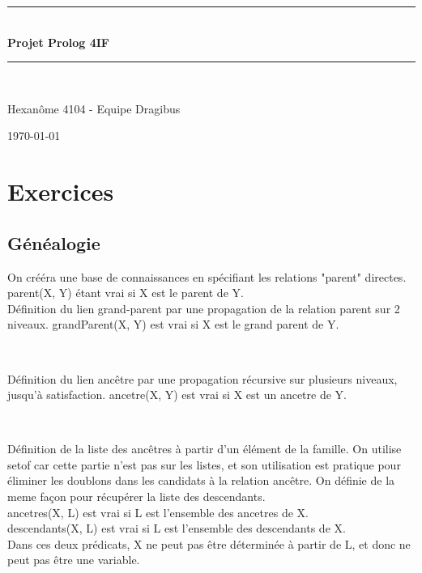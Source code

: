 \documentclass[a4paper, 11pt]{article}
\newcommand{\HRule}{\rule{\linewidth}{0.5mm}}
\newenvironment{DDbox}[1]{
\begin{lrbox}{\BBbox}\begin{minipage}{\linewidth}}
{\end{minipage}\end{lrbox}\noindent\colorbox{Zgris}{\usebox{\BBbox}} \\
[.5cm]}
\begin{document}
\begin{titlepage}
    \begin{center}
        \HRule \\[0.4cm]
        {\huge \bfseries Projet Prolog 4IF}
        \HRule \\[1.5cm]

        \begin{minipage}{0.8\textwidth}
            \center
            \large
            Hexanôme 4104 - Equipe Dragibus
        \end{minipage}

        \vfill
        {\large \today}
    \end{center}
\end{titlepage}

\tableofcontents
\newpage

\section{Exercices}
\subsection{Généalogie}
On crééra une base de connaissances en spécifiant les relations "parent"
directes. parent(X, Y) étant vrai si X est le parent de Y. \\

Définition du lien grand-parent par une propagation de la relation parent sur 2
niveaux. grandParent(X, Y) est vrai si X est le grand parent de Y. \\
\begin{DDbox}{\linewidth}
    
\end{DDbox}

Définition du lien ancêtre par une propagation récursive sur plusieurs
niveaux, jusqu'à satisfaction. ancetre(X, Y) est vrai si X est un ancetre de Y. \\
\begin{DDbox}{\linewidth}
    
\end{DDbox}

Définition de la liste des ancêtres à partir d'un élément de la
famille.  On utilise setof car cette partie n'est pas sur les
listes, et son utilisation est pratique pour éliminer les
doublons dans les candidats à la relation ancêtre. On définie de
la meme façon pour récupérer la liste des descendants. \\
ancetres(X, L) est vrai si L est l'ensemble des ancetres de X. \\
descendants(X, L) est vrai si L est l'ensemble des descendants de X. \\
Dans ces deux prédicats, X ne peut pas être déterminée à partir
de L, et donc ne peut pas être une variable. \\
\begin{DDbox}{\linewidth}
    
\end{DDbox}
\end{document}
